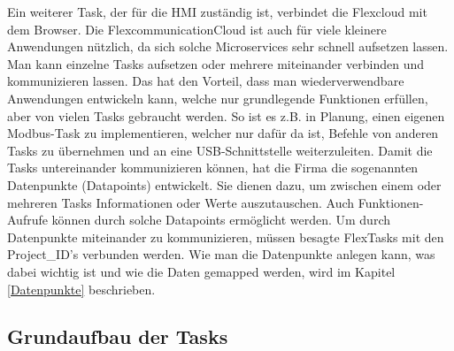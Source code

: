Ein weiterer Task, der für die HMI zuständig ist, verbindet die Flexcloud mit dem Browser. Die FlexcommunicationCloud ist auch für viele kleinere Anwendungen nützlich, da sich solche Microservices sehr schnell aufsetzen lassen. Man kann einzelne Tasks aufsetzen oder mehrere miteinander verbinden und kommunizieren lassen. Das hat den Vorteil, dass man wiederverwendbare Anwendungen entwickeln kann, welche nur grundlegende Funktionen erfüllen, aber von vielen Tasks gebraucht werden. So ist es z.B. in Planung, einen eigenen Modbus-Task zu implementieren, welcher nur dafür da ist, Befehle von anderen Tasks zu übernehmen und an eine USB-Schnittstelle weiterzuleiten.
Damit die Tasks untereinander kommunizieren können, hat die Firma die sogenannten Datenpunkte (Datapoints) entwickelt. Sie dienen dazu, um zwischen einem oder mehreren Tasks Informationen oder Werte auszutauschen. Auch Funktionen-Aufrufe können durch solche Datapoints ermöglicht werden. Um durch Datenpunkte miteinander zu kommunizieren, müssen besagte FlexTasks mit den Project\_ID's verbunden werden.
Wie man die Datenpunkte anlegen kann, was dabei wichtig ist und wie die Daten gemapped werden, wird im Kapitel \ref{Datenpunkte} beschrieben.
\subsection{Grundaufbau der Tasks}

